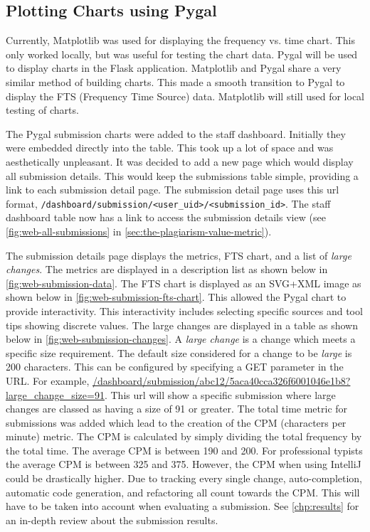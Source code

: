 \subsection{Plotting Charts using Pygal}
Currently, Matplotlib was used for displaying the frequency vs. time chart. This only worked locally, but was useful for testing the chart data. Pygal will be used to display charts in the Flask application\cite{PygalFlask}. Matplotlib and Pygal share a very similar method of building charts. This made a smooth transition to Pygal to display the FTS (Frequency Time Source) data. Matplotlib will still used for local testing of charts.

The Pygal submission charts were added to the staff dashboard. Initially they were embedded directly into the table. This took up a lot of space and was aesthetically unpleasant. It was decided to add a new page which would display all submission details. This would keep the submissions table simple, providing a link to each submission detail page. The submission detail page uses this url format, \texttt{/dashboard/submission/<user\_uid>/<submission\_id>}. The staff dashboard table now has a link to access the submission details view (see \autoref{fig:web-all-submissions} in \autoref{sec:the-plagiarism-value-metric}).

The submission details page displays the metrics, FTS chart, and a list of \textit{large changes}. The metrics are displayed in a description list as shown below in \autoref{fig:web-submission-data}. The FTS chart is displayed as an SVG+XML image as shown below in \autoref{fig:web-submission-fts-chart}. This allowed the Pygal chart to provide interactivity. This interactivity includes selecting specific sources and tool tips showing discrete values. The large changes are displayed in a table as shown below in \autoref{fig:web-submission-changes}. A \textit{large change} is a change which meets a specific size requirement. The default size considered for a change to be \textit{large} is 200 characters. This can be configured by specifying a GET parameter in the URL. For example, \url{/dashboard/submission/abc12/5aca40cca326f6001046e1b8?large\_change\_size=91}. This url will show a specific submission where large changes are classed as having a size of 91 or greater. The total time metric for submissions was added which lead to the creation of the CPM (characters per minute) metric. The CPM is calculated by simply dividing the total frequency by the total time. The average CPM is between 190 and 200\cite{LiveChatTypingSpeedTest}. For professional typists the average CPM is between 325 and 375. However, the CPM when using IntelliJ could be drastically higher. Due to tracking every single change, auto-completion, automatic code generation, and refactoring all count towards the CPM. This will have to be taken into account when evaluating a submission. See \autoref{chp:results} for an in-depth review about the submission results.

